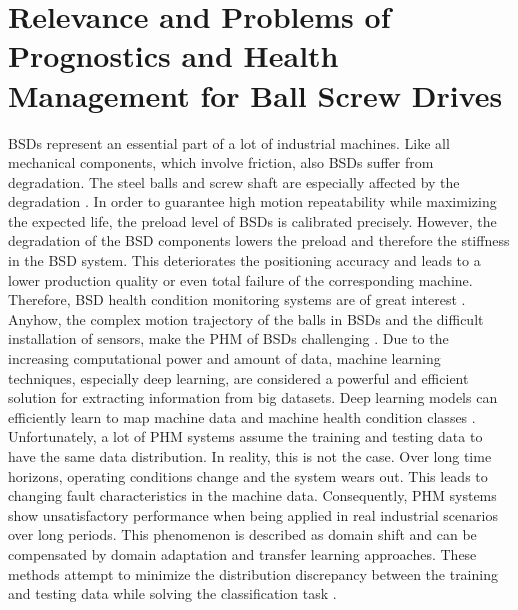 \section{Relevance and Problems of Prognostics and Health Management for Ball Screw Drives}
BSDs represent an essential part of a lot of industrial machines. Like all mechanical components, which involve friction, also BSDs suffer from degradation. The steel balls and screw shaft are especially affected by the degradation \cite{Pandhare2021}. In order to guarantee high motion repeatability while maximizing the expected life, the preload level of BSDs is calibrated precisely. However, the degradation of the BSD components lowers the preload and therefore the stiffness in the BSD system. This deteriorates the positioning accuracy and leads to a lower production quality or even total failure of the corresponding machine. Therefore, BSD health condition monitoring systems are of great interest \cite{Pandhare2021}. Anyhow, the complex motion trajectory of the balls in BSDs and the difficult installation of sensors, make the PHM of BSDs challenging \cite{LiPin2018}. Due to the increasing computational power and amount of data, machine learning techniques, especially deep learning, are considered a powerful and efficient solution for extracting information from big datasets. Deep learning models can efficiently learn to map machine data and machine health condition classes \cite{ZHAO2019213}. Unfortunately, a lot of PHM systems assume the training and testing data to have the same data distribution. In reality, this is not the case. Over long time horizons, operating conditions change and the system wears out. This leads to changing fault characteristics in the machine data. Consequently, PHM systems show unsatisfactory performance when being applied in real industrial scenarios over long periods. This phenomenon is described as domain shift and can be compensated by domain adaptation and transfer learning approaches. These methods attempt to minimize the distribution discrepancy between the training and testing data while solving the classification task \cite{AZAMFAR2020103932}.


